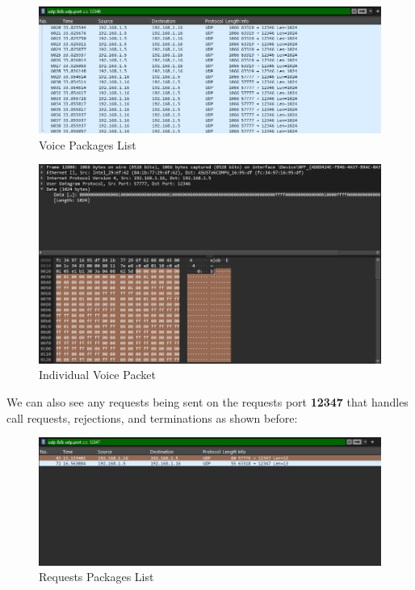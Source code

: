 \documentclass[12pt]{report}
\begin{document}
\begin{figure}[h!]
    \centering
    \includegraphics[width=1\linewidth]{Screenshot 2024-12-12 115616.png}
    \caption{Voice Packages List}
    \label{fig:enter-label}
\end{figure}

\begin{figure}[h!]
    \centering
    \includegraphics[width=1\linewidth]{Screenshot 2024-12-12 115653.png}
    \caption{Individual Voice Packet}
    \label{fig:enter-label}
\end{figure}

\newpage
We can also see any requests being sent on the requests port \textbf{12347} that handles call requests, rejections, and terminations as shown before:

\begin{figure}[h!]
    \centering
    \includegraphics[width=1\linewidth]{Screenshot 2024-12-12 120132.png}
    \caption{Requests Packages List}
    \label{fig:enter-label}
\end{figure}
\end{document}
